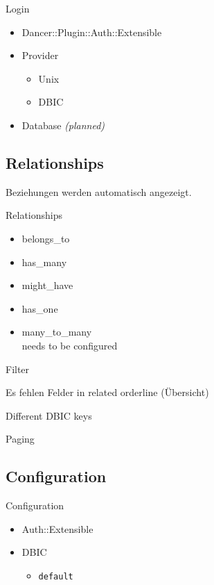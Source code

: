 \begin{frame}{Login}
\begin{itemize}
\item Dancer::Plugin::Auth::Extensible
\item Provider
\begin{itemize}
\item Unix
\item DBIC
\end{itemize}
\item Database \textit{(planned)}
\end{itemize}
\end{frame}

\subsection{Relationships}

Beziehungen werden automatisch angezeigt.

\begin{frame}{Relationships}
\begin{itemize}
\item belongs\_to
\item has\_many
\item might\_have
\item has\_one
\item many\_to\_many \\
      needs to be configured
\end{itemize}
\end{frame}

Filter

Es fehlen Felder in related orderline (Übersicht)

Different DBIC keys

Paging


\subsection{Configuration}
\begin{frame}[fragile]{Configuration}
\begin{itemize}
\item Auth::Extensible
\item DBIC
\begin{itemize}
\item \verb|default|
\end{itemize}
\end{itemize}
\end{frame}

